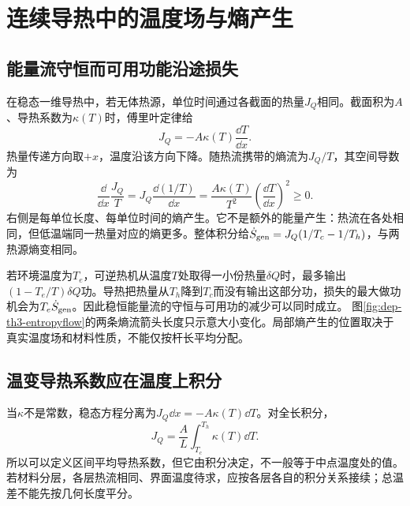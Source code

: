 \section{连续导热中的温度场与熵产生}
\subsection{能量流守恒而可用功能沿途损失}
在稳态一维导热中，若无体热源，单位时间通过各截面的热量$J_Q$相同。截面积为$A$、导热系数为$\kappa(T)$时，傅里叶定律给
\[
 J_Q=-A\kappa(T)\frac{\dd T}{\dd x}.
\]
热量传递方向取$+x$，温度沿该方向下降。随热流携带的熵流为$J_Q/T$，其空间导数为
\[
 \frac{\dd}{\dd x}\frac{J_Q}{T}
 =J_Q\frac{\dd(1/T)}{\dd x}
 =\frac{A\kappa(T)}{T^2}\left(\frac{\dd T}{\dd x}\right)^2\geq0.
\]
右侧是每单位长度、每单位时间的熵产生。它不是额外的能量产生：热流在各处相同，但低温端同一热量对应的熵更多。整体积分给$\dot S_{\rm gen}=J_Q(1/T_c-1/T_h)$，与两热源熵变相同。

若环境温度为$T_e$，可逆热机从温度$T$处取得一小份热量$\delta Q$时，最多输出$(1-T_e/T)\delta Q$功。导热把热量从$T_h$降到$T_c$而没有输出这部分功，损失的最大做功机会为$T_e\dot S_{\rm gen}$。因此稳恒能量流的守恒与可用功的减少可以同时成立。
图\ref{fig:dep-th3-entropyflow}的两条熵流箭头长度只示意大小变化。局部熵产生的位置取决于真实温度场和材料性质，不能仅按杆长平均分配。

\subsection{温变导热系数应在温度上积分}
当$\kappa$不是常数，稳态方程分离为$J_Q\dd x=-A\kappa(T)\dd T$。对全长积分，
\[
 J_Q=\frac A L\int_{T_c}^{T_h}\kappa(T)\dd T.
\]
所以可以定义区间平均导热系数，但它由积分决定，不一般等于中点温度处的值。若材料分层，各层热流相同、界面温度待求，应按各层各自的积分关系接续；总温差不能先按几何长度平分。

